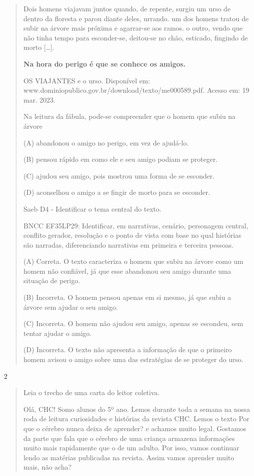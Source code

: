 \begin{escolha}
\begin{escolha}
{\begin{quote}
Dois homens viajavam juntos quando, de repente, surgiu um urso de dentro
da floresta e parou diante deles, urrando. um dos homens tratou de subir
na árvore mais próxima e agarrar-se aos ramos. o outro, vendo que não
tinha tempo para esconder-se, deitou-se no chão, esticado, fingindo de
morto {[}\ldots{}{]}.

\textbf{Na hora do perigo é que se conhece os amigos.}

OS VIAJANTES e o urso. Disponível em:
www.dominiopublico.gov.br/download/texto/me000589.pdf. Acesso em: 19
mar. 2023.

Na leitura da fábula, pode-se compreender que o homem que subiu na
árvore

(A) abandonou o amigo no perigo, em vez de ajudá-lo.

(B) pensou rápido em como ele e seu amigo podiam se proteger.

(C) ajudou seu amigo, pois mostrou uma forma de se esconder.

(D) aconselhou o amigo a se fingir de morto para se esconder.

Saeb D4 - Identificar o tema central do texto.

BNCC EF35LP29: Identificar, em narrativas, cenário, personagem central,
conflito gerador, resolução e o ponto de vista com base no qual
histórias são narradas, diferenciando narrativas em primeira e terceira
pessoas.

(A) Correta. O texto caracteriza o homem que subiu na árvore como um
homem não confiável, já que esse abandonou seu amigo durante uma
situação de perigo.

(B) Incorreta. O homem pensou apenas em si mesmo, já que subiu a árvore
sem ajudar o seu amigo.

(C) Incorreta. O homem não ajudou seu amigo, apenas se escondeu, sem
tentar ajudar o amigo.

(D) Incorreta. O texto não apresenta a informação de que o primeiro
homem avisou o amigo sobre uma das estratégias de se proteger do urso.
\end{quote}

\num{2}

\begin{quote}
Leia o trecho de uma carta do leitor coletiva.

Olá, CHC! Somo alunos do 5º ano. Lemos durante toda a semana na nossa
roda de leitura curiosidades e histórias da revista CHC. Lemos o texto
Por que o cérebro nunca deixa de aprender? e achamos muito legal.
Gostamos da parte que fala que o cérebro de uma criança armazena
informações muito mais rapidamente que o de um adulto. Por isso, vamos
continuar lendo as matérias publicadas na revista. Assim vamos aprender
muito mais, não acha?


\end{quote}}
\end{escolha}
\end{escolha}
